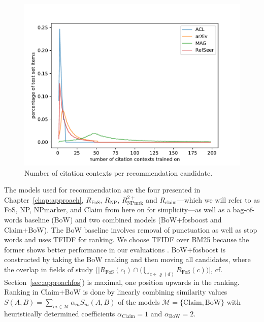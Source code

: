 \begin{figure}[tb]
  \centering
    \includegraphics[width=.8\textwidth]{figures/evaluation/comparison_contexts_per_cited_doc.pdf}
  \caption{Number of citation contexts per recommendation candidate.}
  \label{fig:evalcomp}
\end{figure}


The models used for recommendation are the four presented in Chapter~\ref{chap:approach}, ${R_{\text{FoS}}}$, ${R_{\text{NP}}}$, ${R_{\text{NPmrk}}^{2+}}$ and $R_{\text{claim}}$---which we will refer to as FoS, NP, NPmarker, and Claim from here on for simplicity---as well as a bag-of-words baseline (BoW) and two combined models (BoW+fosboost and Claim+BoW). The BoW baseline involves removal of punctuation as well as stop words and uses TFIDF for ranking. We choose TFIDF over BM25 because the former shows better performance in our evaluations%
. BoW+fosboost is constructed by taking the BoW ranking and then moving all candidates, where the overlap in fields of study (${\big|R_{\text{FoS}}(c_i)\cap\big(\bigcup\limits_{c \in \varrho(d)} R_{\text{FoS}}(c)\big)\big|}$, cf. Section~\ref{sec:approachfos}) is maximal, one position upwards in the ranking. Ranking in Claim+BoW is done by linearly combining similarity values $S(A,B)=\sum\limits_{m\in\mathcal{M}}\alpha_mS_m(A,B)$ of the models $\mathcal{M}=\{\text{Claim},\text{BoW}\}$ with heuristically determined coefficients $\alpha_{\text{Claim}}=1$ and $\alpha_{\text{BoW}}=2$.

